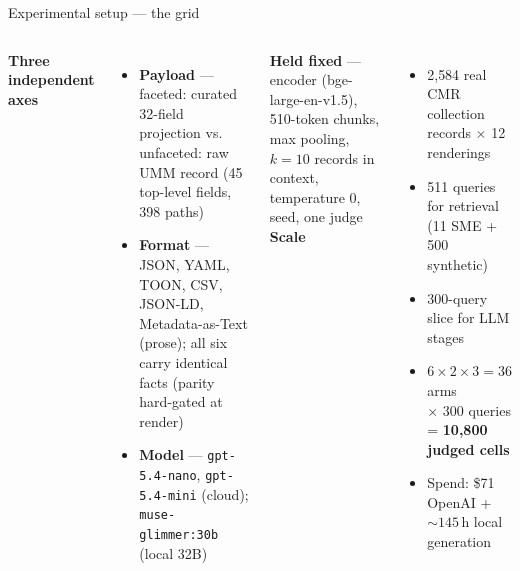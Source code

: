 \documentclass[aspectratio=169,10pt]{beamer}
\newcommand{\muted}[1]{\textcolor{inksec}{#1}}
\begin{document}
\begin{frame}{Experimental setup --- the grid}
  \begin{columns}[t]
    \textbf{Three independent axes}
    \begin{itemize}
      \item \textbf{Payload} --- \textcolor{accent}{faceted}: curated 32-field projection
        \;vs.\; \textcolor{accent2}{unfaceted}: raw UMM record (45 top-level fields, 398 paths)
      \item \textbf{Format} --- JSON, YAML, TOON, CSV, JSON-LD, Metadata-as-Text (prose);
        all six carry identical facts (parity hard-gated at render)
      \item \textbf{Model} --- \texttt{gpt-5.4-nano}, \texttt{gpt-5.4-mini} (cloud);
        \texttt{muse-glimmer:30b} (local 32B)
    \end{itemize}
    \medskip
    \textbf{Held fixed} \muted{--- encoder (bge-large-en-v1.5), 510-token chunks,
    max pooling, $k{=}10$ records in context, temperature 0, seed, one judge}
    \textbf{Scale}
    \begin{itemize}
      \item 2{,}584 real CMR collection records $\times$ 12 renderings
      \item 511 queries for retrieval \muted{(11 SME + 500 synthetic)}
      \item 300-query slice for LLM stages
      \item $6 \times 2 \times 3 = 36$ arms\\ $\times$ 300 queries = \textbf{10{,}800 judged cells}
      \item Spend: \$71 OpenAI + ${\sim}145$\,h local generation
    \end{itemize}
  \end{columns}
\end{frame}
\end{document}
